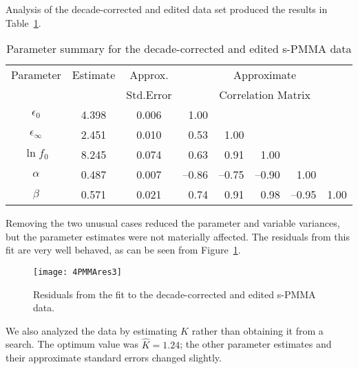 \begin{example}
Analysis of the decade-corrected and edited data set produced
the results in
Table~\ref{tbl:4.4}.
\begin{table}
  \caption{\label{tbl:4.4}
  Parameter summary for the decade-corrected and edited s-PMMA data}
  \begin{center}
    \begin{tabular}{cccrrrrr}\hline
      \multicolumn{1}{c}{Parameter} & \multicolumn{1}{c}{Estimate} &
      \multicolumn{1}{c}{Approx.} & \multicolumn{5}{c}{Approximate}\\
      && \multicolumn{1}{c}{Std.Error} &
      \multicolumn{5}{c}{Correlation Matrix}\\ \hline 
      $\epsilon_{0}$&4.398&0.006&1.00\\
      $\epsilon_{\infty}$&2.451&0.010&0.53&1.00\\
      $\ln f_{0}$&8.245&0.074&0.63&0.91&1.00\\
      $\alpha$&0.487&0.007&--\/0.86&--\/0.75&--\/0.90&1.00\\
      $\beta$&0.571&0.021&0.74&0.91&0.98&--\/0.95&1.00\\
    \end{tabular}
  \end{center}
\end{table}
Removing the two unusual cases reduced the parameter and
variable variances, but the parameter estimates were not
materially affected.
The residuals from this fit are very well behaved, as can
be seen from Figure~\ref{fig:PMMAres3}.
\begin{figure}
  \centerline{\texttt{[image: 4PMMAres3]}}%
  \caption{\label{fig:PMMAres3}
  Residuals from the fit to the decade-corrected and edited s-PMMA data.}
\end{figure}

We also analyzed the data by estimating $K$ rather than
obtaining it from a search.
The optimum value was $\hat K=1.24$;
the other parameter estimates and their approximate standard errors
changed slightly.
\end{example}

